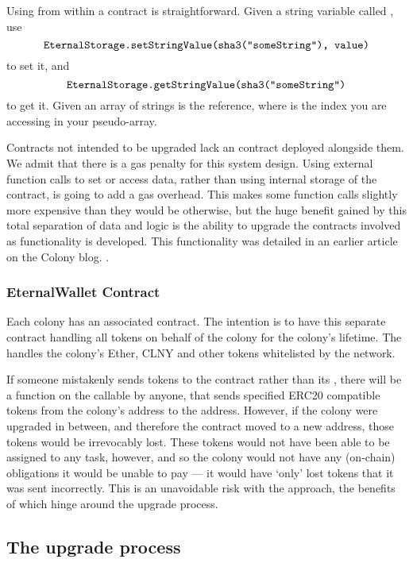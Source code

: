 Using  from within a contract is straightforward. Given a string variable called , use
\[
\texttt{EternalStorage.setStringValue(sha3("someString"), value)}
\]
to set it, and
\[
\texttt{EternalStorage.getStringValue(sha3("someString")}
\]
to get it. Given an array of strings  is the reference, where  is the index you are accessing in your pseudo-array.

Contracts not intended to be upgraded lack an  contract deployed alongside them. We admit that there is a gas penalty for this system design. Using external function calls to set or access data, rather than using internal storage of the contract, is going to add a gas overhead. This makes some function calls slightly more expensive than they would be otherwise, but the huge benefit gained by this total separation of data and logic is the ability to upgrade the contracts involved as functionality is developed. This functionality was detailed in an earlier article on the Colony blog. \cite{UpgradingContracts}. 

\subsubsection{EternalWallet Contract}
Each colony has an associated  contract. The intention is to have this separate contract handling all tokens on behalf of the colony for the colony's lifetime. The  handles the colony's Ether, CLNY and other tokens whitelisted by the network. 

If someone mistakenly sends tokens to the  contract rather than its , there will be a function on the  callable by anyone, that sends specified ERC20 compatible tokens from the colony's address to the  address. However, if the colony were upgraded in between, and therefore the  contract moved to a new address, those tokens would be irrevocably lost. These tokens would not have been able to be assigned to any task, however, and so the colony would not have any (on-chain) obligations it would be unable to pay --- it would have `only' lost tokens that it was sent incorrectly. This is an unavoidable risk with the  approach, the benefits of which hinge around the upgrade process.

\subsection{The upgrade process}

